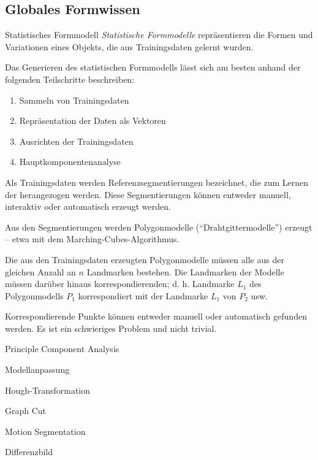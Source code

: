 \subsection{Globales Formwissen}

\begin{defi}{Statistisches Formmodell}
    \emph{Statistische Formmodelle} repräsentieren die Formen und Variationen eines Objekts, die aus Trainingsdaten gelernt wurden.

    Das Generieren des statistischen Formmodells lässt sich am besten anhand der folgenden Teilschritte beschreiben:
    \begin{enumerate}
        \item Sammeln von Trainingsdaten
        \item Repräsentation der Daten als Vektoren
        \item Ausrichten der Trainingsdaten
        \item Hauptkomponentenanalyse
    \end{enumerate}

    Als Trainingsdaten werden Referenzsegmentierungen bezeichnet, die zum Lernen der herangezogen werden.
    Diese Segmentierungen können entweder manuell, interaktiv oder automatisch erzeugt werden.

    Aus den Segmentierungen werden Polygonmodelle (\enquote{Drahtgittermodelle}) erzeugt -- etwa mit dem Marching-Cubes-Algorithmus.

    Die aus den Trainingsdaten erzeugten Polygonmodelle müssen alle aus der gleichen Anzahl an $n$ Landmarken bestehen.
    Die Landmarken der Modelle müssen darüber hinaus korrespondierenden;
    d. h. Landmarke $L_1$ des Polygonmodells $P_1$ korrespondiert mit der Landmarke $L_1$ von $P_2$ usw.

    Korrespondierende Punkte können entweder manuell oder automatisch gefunden werden.
    Es ist ein schwieriges Problem und nicht trivial.
\end{defi}

\begin{defi}{Principle Component Analysis}

\end{defi}

\begin{defi}{Modellanpassung}

\end{defi}

\begin{defi}{Hough-Transformation}

\end{defi}

\begin{defi}{Graph Cut}

\end{defi}

\begin{defi}{Motion Segmentation}

\end{defi}

\begin{defi}{Differenzbild}

\end{defi}